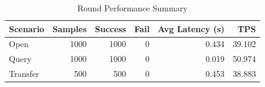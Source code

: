 \begin{table}
\caption{Round Performance Summary}
\label{tab:round_perf}
\begin{tabular}{lrrrrr}
\toprule
Scenario & Samples & Success & Fail & Avg Latency (s) & TPS \\
\midrule
Open & 1000 & 1000 & 0 & 0.434 & 39.102 \\
Query & 1000 & 1000 & 0 & 0.019 & 50.974 \\
Transfer & 500 & 500 & 0 & 0.453 & 38.883 \\
\bottomrule
\end{tabular}
\end{table}
